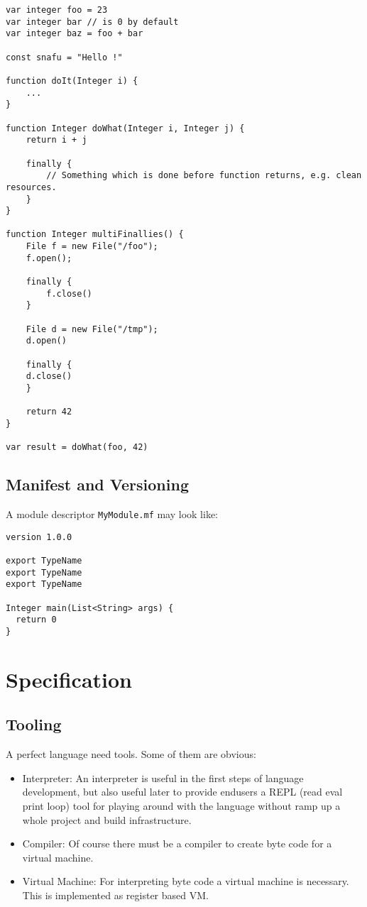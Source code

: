 \documentclass[a4paper,12pt]{article}
\begin{document}
\begin{verbatim}
var integer foo = 23
var integer bar // is 0 by default
var integer baz = foo + bar

const snafu = "Hello !"

function doIt(Integer i) {
    ...
}

function Integer doWhat(Integer i, Integer j) {
    return i + j
    
    finally {
    	// Something which is done before function returns, e.g. clean resources.
    }
}

function Integer multiFinallies() {
    File f = new File("/foo");
    f.open();
    
    finally {
        f.close()
    }
    
    File d = new File("/tmp");
    d.open()
    
    finally {
    d.close()
    }
    
    return 42
}

var result = doWhat(foo, 42)	
\end{verbatim}

\subsection{Manifest and Versioning}

A module descriptor \verb|MyModule.mf| may look like:

\begin{verbatim}
version 1.0.0

export TypeName
export TypeName
export TypeName

Integer main(List<String> args) {
  return 0
}
\end{verbatim}

\section{Specification}

\subsection{Tooling}

A perfect language need tools. Some of them are obvious:

\begin{itemize}
    \item Interpreter: An interpreter is useful in the first steps of language development, but also useful later to provide endusers a REPL (read eval print loop) tool for playing around with the language without ramp up a whole project and build infrastructure.
    \item Compiler: Of course there must be a compiler to create byte code for a virtual machine.
    \item Virtual Machine: For interpreting byte code a virtual machine is necessary. This is implemented as register based VM.
\end{itemize}
\end{document}
